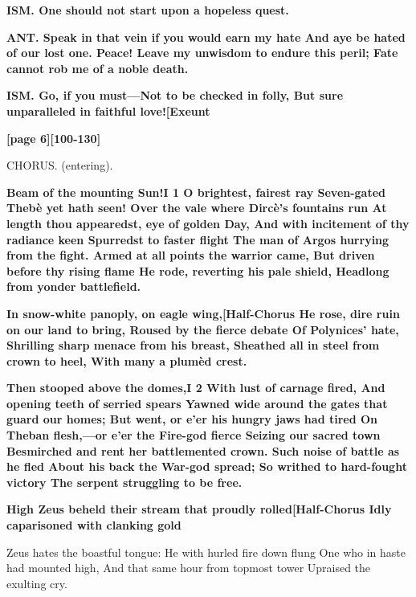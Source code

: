 \documentclass[11pt,letter]{book}
\begin{document}
\par \textbf{ISM. One should not start upon a hopeless quest.}
\par 

\par \textbf{ANT. Speak in that vein if you would earn my hate And aye be hated of our lost one. Peace! Leave my unwisdom to endure this peril; Fate cannot rob me of a noble death.}
\par 

\par \textbf{ISM. Go, if you must—Not to be checked in folly, But sure unparalleled in faithful love![Exeunt}
\par 

\par \textbf{[page 6][100-130]}
\par 

\par  CHORUS. (entering).

\par \textbf{Beam of the mounting Sun!I 1 O brightest, fairest ray Seven-gated Thebè yet hath seen! Over the vale where Dircè’s fountains run At length thou appearedst, eye of golden Day, And with incitement of thy radiance keen Spurredst to faster flight The man of Argos hurrying from the fight. Armed at all points the warrior came, But driven before thy rising flame He rode, reverting his pale shield, Headlong from yonder battlefield.}
\par 

\par \textbf{In snow-white panoply, on eagle wing,[Half-Chorus He rose, dire ruin on our land to bring, Roused by the fierce debate Of Polynices’ hate, Shrilling sharp menace from his breast, Sheathed all in steel from crown to heel, With many a plumèd crest.}
\par 

\par \textbf{Then stooped above the domes,I 2 With lust of carnage fired, And opening teeth of serried spears Yawned wide around the gates that guard our homes; But went, or e’er his hungry jaws had tired On Theban flesh,—or e’er the Fire-god fierce Seizing our sacred town Besmirched and rent her battlemented crown. Such noise of battle as he fled About his back the War-god spread; So writhed to hard-fought victory The serpent struggling to be free.}
\par 

\par \textbf{High Zeus beheld their stream that proudly rolled[Half-Chorus Idly caparisoned with clanking gold}
\par   [page 7][131-154] Zeus hates the boastful tongue:  He with hurled fire down flung One who in haste had mounted high, And that same hour from topmost tower Upraised the exulting cry.
\end{document}
